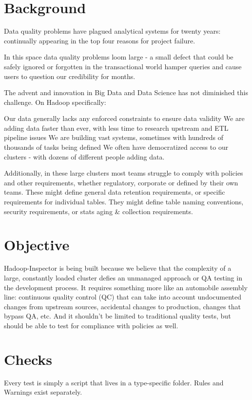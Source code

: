 \begin{abstract}
\end{abstract}

\section{Background}
Data quality problems have plagued analytical systems for twenty years: continually appearing in the top four reasons
for project failure.

In this space data quality problems loom large - a small defect that could be safely ignored or forgotten in the
transactional world hamper queries and cause users to question our credibility for months.

The advent and innovation in Big Data and Data Science has not diminished this challenge. On Hadoop specifically:

Our data generally lacks any enforced constraints to ensure data validity
We are adding data faster than ever, with less time to research upstream and ETL pipeline issues
We are building vast systems, sometimes with hundreds of thousands of tasks being defined
We often have democratized access to our clusters - with dozens of different people adding data.

Additionally, in these large clusters most teams struggle to comply with policies and other
requirements, whether regulatory, corporate or defined by their own teams. These might define
general data retention requirements, or specific requirements for individual tables. They might
define table naming conventions, security requirements, or stats aging \& collection requirements.


\section{Objective}
Hadoop-Inspector is being built because we believe that the complexity of a large, constantly loaded cluster defies an
unmanaged approach or QA testing in the development process. It requires something more like an automobile assembly
line: continuous quality control (QC) that can take into account undocumented changes from upstream sources, accidental
changes to production, changes that bypass QA, etc. And it shouldn't be limited to traditional quality tests, but should
be able to test for compliance with policies as well.

\section{Checks}
Every test is simply a script that lives in a type-specific folder. Rules and Warnings exist separately.

